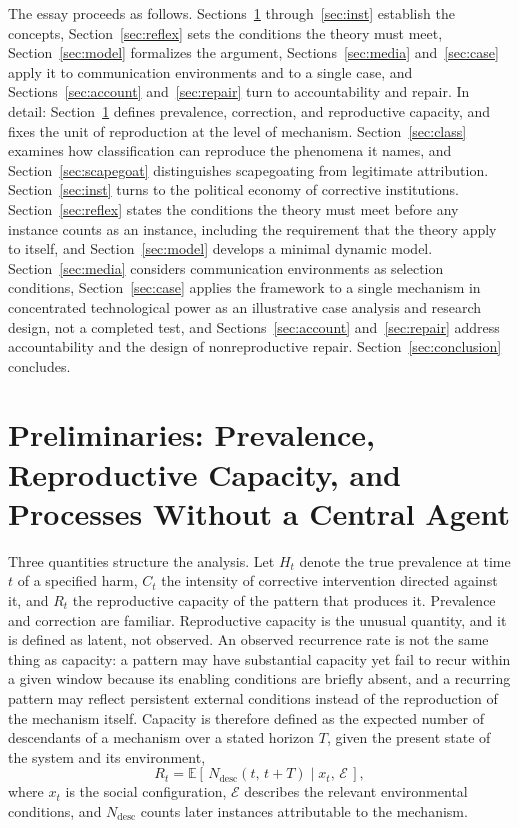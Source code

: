 \documentclass[12pt]{article}
\theoremstyle{remark}
\begin{document}
The essay proceeds as follows. Sections~\ref{sec:prelim} through~\ref{sec:inst} establish the concepts, Section~\ref{sec:reflex} sets the conditions the theory must meet, Section~\ref{sec:model} formalizes the argument, Sections~\ref{sec:media} and~\ref{sec:case} apply it to communication environments and to a single case, and Sections~\ref{sec:account} and~\ref{sec:repair} turn to accountability and repair. In detail: Section~\ref{sec:prelim} defines prevalence, correction, and reproductive capacity, and fixes the unit of reproduction at the level of mechanism. Section~\ref{sec:class} examines how classification can reproduce the phenomena it names, and Section~\ref{sec:scapegoat} distinguishes scapegoating from legitimate attribution. Section~\ref{sec:inst} turns to the political economy of corrective institutions. Section~\ref{sec:reflex} states the conditions the theory must meet before any instance counts as an instance, including the requirement that the theory apply to itself, and Section~\ref{sec:model} develops a minimal dynamic model. Section~\ref{sec:media} considers communication environments as selection conditions, Section~\ref{sec:case} applies the framework to a single mechanism in concentrated technological power as an illustrative case analysis and research design, not a completed test, and Sections~\ref{sec:account} and~\ref{sec:repair} address accountability and the design of nonreproductive repair. Section~\ref{sec:conclusion} concludes.

\section{Preliminaries: Prevalence, Reproductive Capacity, and Processes Without a Central Agent}
\label{sec:prelim}

Three quantities structure the analysis. Let $H_t$ denote the true prevalence at time $t$ of a specified harm, $C_t$ the intensity of corrective intervention directed against it, and $R_t$ the reproductive capacity of the pattern that produces it. Prevalence and correction are familiar. Reproductive capacity is the unusual quantity, and it is defined as latent, not observed. An observed recurrence rate is not the same thing as capacity: a pattern may have substantial capacity yet fail to recur within a given window because its enabling conditions are briefly absent, and a recurring pattern may reflect persistent external conditions instead of the reproduction of the mechanism itself. Capacity is therefore defined as the expected number of descendants of a mechanism over a stated horizon $T$, given the present state of the system and its environment,
\begin{equation}
R_t = \mathbb{E}\left[\, N_{\mathrm{desc}}(t,\,t+T) \mid x_t,\, \mathcal{E} \,\right],
\end{equation}
where $x_t$ is the social configuration, $\mathcal{E}$ describes the relevant environmental conditions, and $N_{\mathrm{desc}}$ counts later instances attributable to the mechanism.
\end{document}
